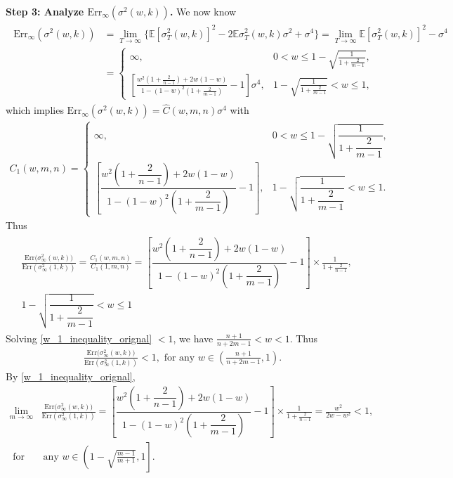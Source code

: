 \noindent
\textbf{Step 3: Analyze $\mathrm{Err}_{\infty}(\sigma^2(w,k))$.}
We now know
\begin{align}
\label{var_cal_step3}
\begin{split}
\mathrm{Err}_{\infty}(\sigma^2(w,k))&=\lim_{T \to \infty}\{\mathbb{E}[\sigma^2_T(w,k)]^2-2\mathbb{E}\sigma^2_T(w,k)\sigma^2+\sigma^4\}=\lim_{T \to \infty}\mathbb{E}
[\sigma^2_T(w,k)]^2-\sigma^4 \\&=\begin{cases} 
\infty, & 0 < w \leq 1 - \sqrt{\frac{1}{1+\frac{2}{m-1}}}, \\[10pt]
\left[\frac{w^2\left(1 + \frac{2}{n-1}\right) + 2w(1-w)}{1 - (1-w)^2\left(1+\frac{2}{m-1}\right)}-1\right]\sigma^4, & 1 - \sqrt{\frac{1}{1+\frac{2}{m-1}}} < w \leq 1,
\end{cases}
\end{split}
\end{align}
which implies 
$\mathrm{Err}_{\infty}(\sigma^2(w,k)) = {\widehat{C}(w,m,n)\sigma^4}$ with 
\begin{align*}
C_1(w,m,n) = \begin{cases} 
\infty, & 0 < w \leq 1 - \sqrt{\dfrac{1}{1+\dfrac{2}{m-1}}}, \\[10pt]
\left[\dfrac{w^2\left(1 + \dfrac{2}{n-1}\right) + 2w(1-w)}{1 - (1-w)^2\left(1+\dfrac{2}{m-1}\right)} - 1 \right] , & 1 - \sqrt{\dfrac{1}{1+\dfrac{2}{m-1}}} < w \leq 1.
\end{cases}
\end{align*}
Thus 
\begin{align}
\begin{split}
\label{w_1_inequality_orignal}
&\frac{\mathrm{Err}\big(\sigma_{\infty}^2(w,k)\big)}{\mathrm{Err}(\sigma_{\infty}^2(1,k))}=\frac{C_1(w,m,n)}{C_1(1,m,n)}=\left[\dfrac{w^2\left(1 + \dfrac{2}{n-1}\right) + 2w(1-w)}{1 - (1-w)^2\left(1+\dfrac{2}{m-1}\right)} - 1 \right]\times \frac{1}{1+\frac{2}{n-1}}, \\& 1 - \sqrt{\dfrac{1}{1+\dfrac{2}{m-1}}} < w \leq 1
\end{split}
\end{align}
Solving \eqref{w_1_inequality_orignal} $<1$, we have
$\frac{n+1}{n+2m-1}<w<1$. Thus 
\begin{align*}
\frac{\mathrm{Err}\big(\sigma_{\infty}^2(w,k)\big)}{\mathrm{Err}(\sigma_{\infty}^2(1,k))}<1, \text{ for any } w 
\in \left(\frac{n+1}{n+2m-1},1\right).
\end{align*}
By \eqref{w_1_inequality_orignal},
\begin{align*}
\lim_{m\rightarrow \infty}&
    \frac{\mathrm{Err}\big(\sigma_{\infty}^2(w,k)\big)}{\mathrm{Err}(\sigma_{\infty}^2(1,k))}=\left[\dfrac{w^2\left(1 + \dfrac{2}{n-1}\right) + 2w(1-w)}{1 - (1-w)^2\left(1+\dfrac{2}{m-1}\right)} - 1 \right]\times \frac{1}{1+\frac{2}{n-1}}=
    \frac{w^2}{2w-w^2}<1,
    \\
    \text{ for} & \ \text{any } w \in \left(1 - \sqrt{\frac{m-1}{m+1}},1\right].
\end{align*}
